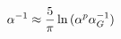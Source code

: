 \begin{equation}
 \alpha^{-1} \approx {5\over\pi}\ln{(\alpha^p\alpha_G^{-1})}
 \label{eq:40}
 \end{equation}

